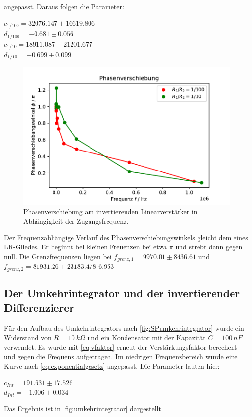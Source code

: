   angepasst. Daraus folgen die Parameter:
  \begin{center}
    $c_{1/100} = 32076.147  \pm 16619.806$\\
    $d_{1/100} =   -0.681 \pm 0.056$\\
    $c_{1/10} = 18911.087 \pm 21201.677$\\
    $d_{1/10} =   -0.699 \pm 0.099$\\
  \end{center}
  \begin{figure}
    \centering
    \includegraphics{content/grafiken/phasenverschiebung.pdf}
    \caption{Phasenverschiebung am invertierenden Linearverstärker in Abhängigkeit der Zugangsfrequenz.}
    \label{fig:phasenverschiebung}
  \end{figure}
Der Frequenzabhängige Verlauf des Phasenverschiebungswinkels gleicht dem eines LR-Gliedes. Er beginnt bei kleinen
Freuenzen bei etwa $\pi$ und strebt dann gegen null.
Die Grenzfrequenzen liegen bei  $f_{grenz,1}=9970.01\pm 8436.61$ und $f_{grenz,2}=81931.26\pm 23183.478$ 6.953

\subsection{Der Umkehrintegrator und der invertierender Differenzierer}
\label{sec:umkehrintegrator}
Für den Aufbau des Umkehrintegrators nach \autoref{fig:SPumkehrintegrator} wurde ein Widerstand von 
$R=\SI[]{10}[]{k\Omega}$ und ein Kondensator mit der Kapazität $C=\SI[]{100}[]{nF}$ verwendet. 
Es wurde mit \autoref{eq:vfaktor} erneut der Verstärkungsfaktor berechent und gegen die Frequenz aufgetragen.
Im niedrigen Frequenzbereich wurde eine Kurve nach \autoref{eq:exponentialgesetz} angepasst. Die Parameter 
lauten hier:
\begin{center}
    $c_{Int} =  191.631 \pm 17.526$\\
    $d_{Int} =   -1.006 \pm 0.034$\\
\end{center}
Das Ergebnis ist in \autoref{fig:umkehrintegrator} dargestellt. 

